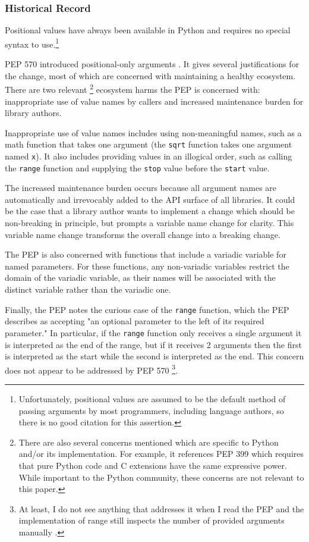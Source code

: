 \subsubsection{Historical Record}
Positional values have always been available in Python and requires no special syntax to
use.\footnote{Unfortunately, positional values are assumed to be the default method of
passing arguments by most programmers, including language authors, so there is no good
citation for this assertion.}

PEP 570 introduced positional-only arguments
\parencite[][peps/pep-0570.rst]{python-peps}.
It gives several justifications for the change, most of which are concerned with
maintaining a healthy ecosystem.
There are two relevant
\footnote{
	There are also several concerns mentioned which are specific to Python
	and/or its implementation.
	For example, it references PEP 399 which requires that pure Python code and C extensions
	have the same expressive power.
	While important to the Python community, these concerns are not relevant to this paper.
}
ecosystem harms the PEP is concerned with: inappropriate use of
value names by callers and increased maintenance burden for library authors.

Inappropriate use of value names includes using non-meaningful names, such as a math
function that takes one argument (the \texttt{sqrt} function takes one argument named
\texttt{x}).
It also includes providing values in an illogical order, such as calling the
\texttt{range} function and supplying the \texttt{stop} value before the \texttt{start}
value.

The increased maintenance burden occurs because all argument names are automatically and
irrevocably added to the API surface of all libraries.
It could be the case that a library author wants to implement a change which should be
non-breaking in principle, but prompts a variable name change for clarity.
This variable name change transforms the overall change into a breaking change.

The PEP is also concerned with functions that include a variadic variable for named
parameters.
For these functions, any non-variadic variables restrict the domain of the variadic
variable, as their names will be associated with the distinct variable rather than the
variadic one.

Finally, the PEP notes the curious case of the \texttt{range} function, which the PEP
describes as accepting "an optional parameter to the left of its required parameter."
In particular, if the \texttt{range} function only receives a single argument it is
interpreted as the end of the range, but if it receives 2 arguments then the first is
interpreted as the start while the second is interpreted as the end.
This concern does not appear to be addressed by PEP 570
\footnote{
	At least, I do not see anything that addresses it when I read the PEP and the
	implementation of range still inspects the number of provided arguments manually
	\parencite[][Objects/rangeobject.c lines 81-120]{python-source}.
}.

